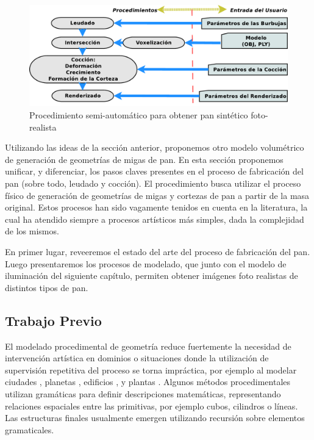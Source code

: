 \begin{figure}
\includegraphics[width=13cm]{figures/pipeline}
\caption{Procedimiento semi-automático para obtener pan sintético foto-realista}
\label{FigPipeline}
\end{figure}

Utilizando las ideas de la sección anterior, proponemos otro modelo volumétrico de generación de geometrías de migas de pan.
En esta sección proponemos unificar, y diferenciar, los pasos claves presentes en el proceso de fabricación del pan (sobre todo, leudado y cocción).
El procedimiento busca utilizar el proceso físico de generación de geometrías de migas y cortezas de pan a partir de la masa original.
Estos procesos han sido vagamente tenidos en cuenta en la literatura, la cual ha atendido siempre a procesos artísticos más simples, dada la complejidad de los mismos.

En primer lugar, reveeremos el estado del arte del proceso de fabricación del pan.
Luego presentaremos los procesos de modelado, que junto con el modelo de iluminación del siguiente capítulo, permiten obtener imágenes foto realistas de distintos tipos de pan.

\subsection{Trabajo Previo}
El modelado procedimental de geometría reduce fuertemente la necesidad de intervención artística en dominios o situaciones donde la utilización de supervisión repetitiva del proceso se torna impráctica, por ejemplo al modelar ciudades \cite{Parish2001}, planetas \cite{Ebert2002}, edificios \cite{Muller2006}, y plantas \cite{Prusinkiewicz1990}. 
Algunos métodos procedimentales utilizan gramáticas para definir descripciones matemáticas, representando relaciones espaciales entre las primitivas, por ejemplo cubos, cilindros o líneas.
Las estructuras finales usualmente emergen utilizando recursión sobre elementos gramaticales.

